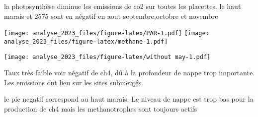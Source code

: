 \documentclass[
]{article}
\begin{document}
la photosynthèse diminue les emissions de co2 sur toutes les placettes.
le haut marais et 2575 sont en négatif en aout septembre,octobre et
novembre

\texttt{[image: analyse\_2023\_files/figure-latex/PAR-1.pdf]}
\texttt{[image: analyse\_2023\_files/figure-latex/methane-1.pdf]}

\texttt{[image: analyse\_2023\_files/figure-latex/without may-1.pdf]}

Taux très faible voir négatif de ch4, dû à la profondeur de nappe trop
importante. Les emissions ont lieu sur les sites submergés.

le pic negatif correspond au haut marais. Le niveau de nappe est trop
bas pour la production de ch4 mais les methanotrophes sont toujours
actifs
\end{document}
